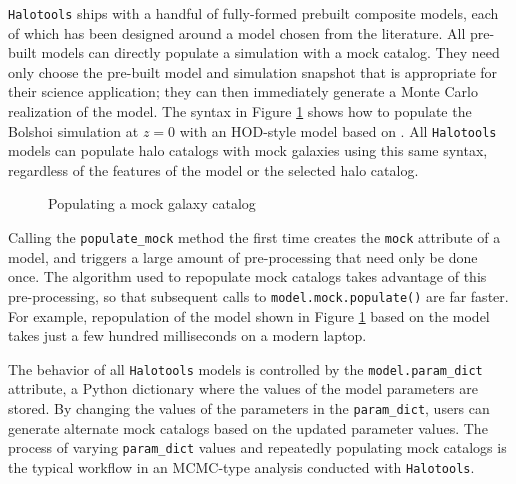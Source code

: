 \documentclass[twocolumn, tighten]{aastex6}
\begin{document}
{\tt Halotools} ships with a handful of fully-formed prebuilt composite models, each of which has been designed around a model chosen from the literature. All pre-built models can directly populate a simulation with a mock catalog. They need only choose the pre-built model and simulation snapshot that is appropriate for their science application; they can then immediately generate a Monte Carlo realization of the model. The syntax in Figure \ref{code:mockpop} shows how to populate the Bolshoi simulation at $z=0$ with an HOD-style model based on \citet{leauthaud11b}. All {\tt Halotools} models can populate halo catalogs with mock galaxies using this same syntax, regardless of the features of the model or the selected halo catalog.

 \begin{figure}
\center
\caption{Populating a mock galaxy catalog\label{code:mockpop}}
\vspace{0.1in}
\end{figure}

Calling the {\tt populate\_mock} method the first time creates the {\tt mock} attribute of a model, and triggers a large amount of pre-processing that need only be done once. The algorithm used to repopulate mock catalogs takes advantage of this pre-processing, so that subsequent calls to {\tt model.mock.populate()} are far faster. For example, repopulation of the model shown in Figure \ref{code:mockpop} based on the \citet{leauthaud11b} model takes just a few hundred milliseconds on a modern laptop.

The behavior of all {\tt Halotools} models is controlled by the {\tt model.param\_dict} attribute, a Python dictionary where the values of the model parameters are stored. By changing the values of the parameters in the {\tt param\_dict}, users can generate alternate mock catalogs based on the updated parameter values. The process of varying {\tt param\_dict} values and repeatedly populating mock catalogs is the typical workflow in an MCMC-type analysis conducted with {\tt Halotools}.
\end{document}
